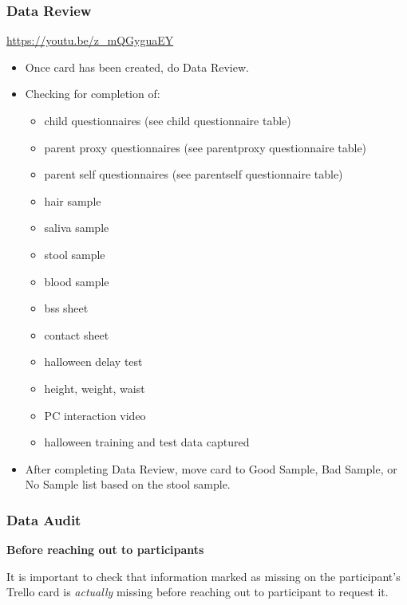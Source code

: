 \documentclass[
]{book}
\providecommand{\tightlist}{%
  \setlength{\itemsep}{0pt}\setlength{\parskip}{0pt}}
\begin{document}
\hypertarget{data-review-1}{%
\subsubsection{Data Review}\label{data-review-1}}

\url{https://youtu.be/z_mQGyguaEY}

\begin{itemize}
\item
  Once card has been created, do Data Review.
\item
  Checking for completion of:

  \begin{itemize}
  \tightlist
  \item
    child questionnaires (see child questionnaire table)
  \item
    parent proxy questionnaires (see parentproxy questionnaire table)
  \item
    parent self questionnaires (see parentself questionnaire table)
  \item
    hair sample
  \item
    saliva sample
  \item
    stool sample
  \item
    blood sample\\
  \item
    bss sheet
  \item
    contact sheet
  \item
    halloween delay test
  \item
    height, weight, waist
  \item
    PC interaction video
  \item
    halloween training and test data captured
  \end{itemize}
\item
  After completing Data Review, move card to Good Sample, Bad Sample, or No Sample list based on the stool sample.
\end{itemize}

\hypertarget{data-audit-1}{%
\subsubsection{Data Audit}\label{data-audit-1}}

\textbf{Before reaching out to participants}

It is important to check that information marked as missing on the participant's Trello card is \emph{actually} missing before reaching out to participant to request it.
\end{document}
